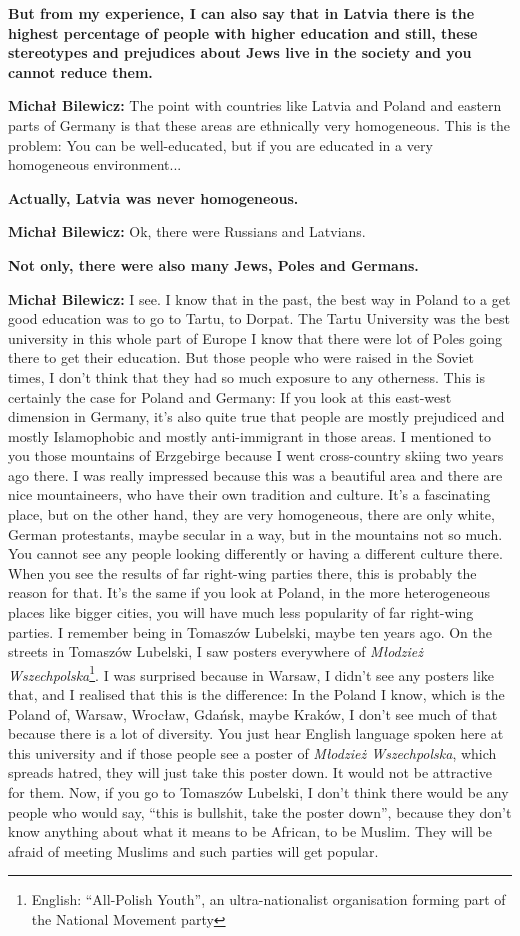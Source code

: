 \textbf{But from my experience, I can also say that in Latvia there is the highest percentage of people with higher education and still, these stereotypes and prejudices about Jews live in the society and you cannot reduce them.} 

\textbf{Michał Bilewicz:} The point with countries like Latvia and Poland and eastern parts of Germany is that these areas are ethnically very homogeneous. This is the problem: You can be well-educated, but if you are educated in a very homogeneous environment...

\textbf{Actually, Latvia was never homogeneous.}

\textbf{Michał Bilewicz:} Ok, there were Russians and Latvians.

\textbf{Not only, there were also many Jews, Poles and Germans.}

\textbf{Michał Bilewicz:} I see. I know that in the past, the best way in Poland to a get good education was to go to Tartu, to Dorpat. The Tartu University was the best university in this whole part of Europe I know that there were lot of Poles going there to get their education. But those people who were raised in the Soviet times, I don’t think that they had so much exposure to any otherness. This is certainly the case for Poland and Germany: If you look at this east-west dimension in Germany, it’s also quite true that people are mostly prejudiced and mostly Islamophobic and mostly anti-immigrant in those areas. I mentioned to you those mountains of Erzgebirge because I went cross-country skiing two years ago there. I was really impressed because this was a beautiful area and there are nice mountaineers, who have their own tradition and culture. It’s a fascinating place, but on the other hand, they are very homogeneous, there are only white, German protestants, maybe secular in a way, but in the mountains not so much. You cannot see any people looking differently or having a different culture there. When you see the results of far right-wing parties there, this is probably the reason for that. It's the same if you look at Poland, in the more heterogeneous  places like bigger cities, you will have much less popularity of far right-wing parties. I remember being in Tomaszów Lubelski, maybe ten years ago. On the streets in Tomaszów Lubelski, I saw posters everywhere of \textit{Młodzież Wszechpolska}\footnote{English: ``All-Polish Youth'', an ultra-nationalist organisation forming part of the National Movement party}. I was surprised because in Warsaw, I didn’t see any posters like that, and I realised that this is the difference: In the Poland I know, which is the Poland of, Warsaw, Wrocław, Gdańsk, maybe Kraków, I don’t see much of that because there is a lot of diversity. You just hear English language spoken here at this university and if those people see a poster of \textit{Młodzież Wszechpolska}, which spreads hatred, they will just take this poster down. It would not be attractive for them. Now, if you go to Tomaszów Lubelski, I don’t think there would be any people who would say, ``this is bullshit, take the poster down'', because they don’t know anything about what it means to be African, to be Muslim. They will be afraid of meeting Muslims and such parties will get popular.

